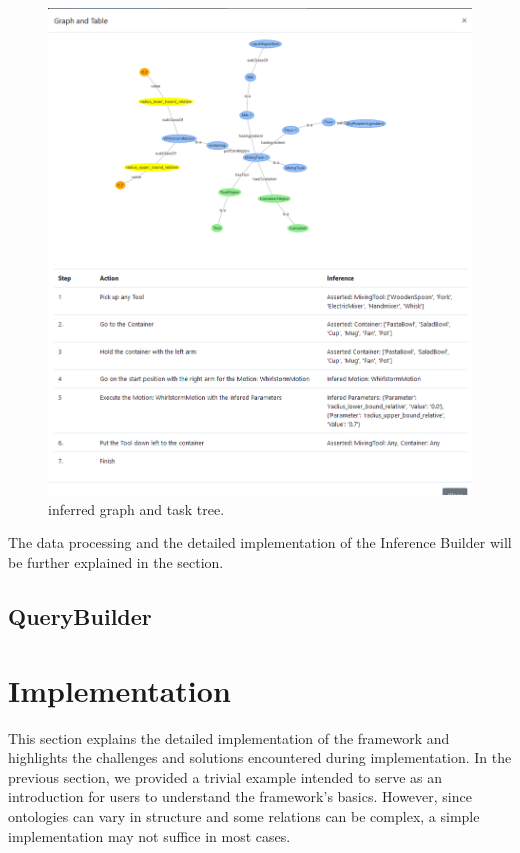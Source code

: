 \begin{figure}[H]
    \includegraphics[scale=0.5]{Graphics/new_inference_graph.png}
    \caption{inferred graph and task tree.}
    \label{fig:graph_inferred}
\end{figure}

The data processing and the detailed implementation of the Inference Builder will be further explained in the  section.
\subsection{QueryBuilder}

\section{Implementation}
\label{sec:Implementation}

This section explains the detailed implementation of the framework and highlights the challenges and solutions encountered during implementation. In the previous section, we provided a trivial example intended to serve as an introduction for users to understand the framework's basics. However, since ontologies can vary in structure and some relations can be complex, a simple implementation may not suffice in most cases.

